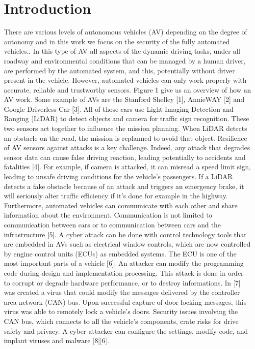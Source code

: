 \section{Introduction}
    There are various levels of autonomous vehicles (AV) depending on the degree of autonomy and in this work we focus on the security of the fully automated vehicles.. In this type of AV all aspects of the dynamic driving tasks, under all roadway and environmental conditions that can be managed by a human driver, are performed by the automated system, and this, potentially without driver present in the vehicle. However, automated vehicles can only work properly with accurate, reliable and trustworthy sensors. Figure 1 give us an overview of how an AV work.
    \newline
    Some example of AVs are the Stanford Shelley [1], AnnieWAY [2] and Google Driverless Car [3]. All of those cars use Light Imaging Detection and Ranging (LiDAR) to detect objects and camera for traffic sign recognition. These two sensors act together to influence the mission planning. When LiDAR detects an obstacle on the road, the mission is replanned to avoid that object. Resilience of AV sensors against attacks is a key challenge. Indeed, any attack that degrades sensor data can cause false driving reaction, leading potentially to accidents and fatalities [4]. For example, if camera is attacked, it can misread a speed limit sign, leading to unsafe driving conditions for the vehicle’s passengers. If a LiDAR detects a fake obstacle because of an attack and triggers an emergency brake, it will seriously alter traffic efficiency if it’s done for example in the highway. 
    \newline
    Furthermore, automated vehicles can communicate with each other and share information about the environment. Communication is not limited to communication between cars or to communication between cars and the infrastructure [5]. A cyber attack can be done with control technology tools that are embedded in AVs such as electrical window controls, which are now controlled by engine control units (ECUs) as embedded systems. The ECU is one of the most important parts of a vehicle [6]. An attacker can modify the programming code during design and implementation processing. This attack is done in order to corrupt or degrade hardware performance, or to destroy informations. In [7] was created a virus that could modify the messages delivered by the controller area network (CAN) bus. Upon successful capture of door locking messages, this virus was able to remotely lock a vehicle’s doors. Security issues involving the CAN bus, which connects to all the vehicle’s components, crate risks for drive safety and privacy. A cyber attacker can configure the settings, modify code, and implant viruses and malware [8][6].
